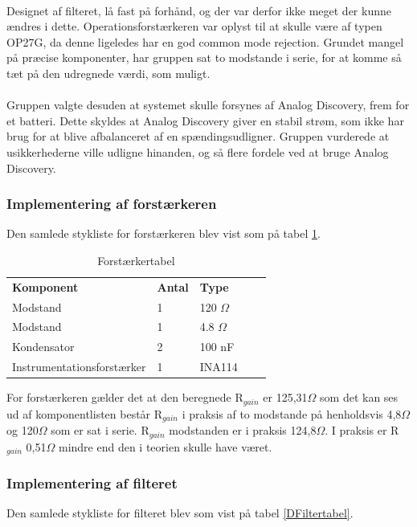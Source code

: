 \\
Designet af filteret, lå fast på forhånd, og der var derfor ikke meget der kunne ændres i dette. Operationsforstærkeren var oplyst til at skulle være af typen OP27G, da denne ligeledes har en god common mode rejection. Grundet mangel på præcise komponenter, har gruppen sat to modstande i serie, for at komme så tæt på den udregnede værdi, som muligt. \\
\\
Gruppen valgte desuden at systemet skulle forsynes af Analog Discovery, frem for et batteri. Dette skyldes at Analog Discovery giver en stabil strøm, som ikke har brug for at blive afbalanceret af en spændingsudligner. Gruppen vurderede at usikkerhederne ville udligne hinanden, og så flere fordele ved at bruge Analog Discovery.\\


\subsubsection{Implementering af forstærkeren}
Den samlede stykliste for forstærkeren blev vist som på tabel \ref{DForsttabel}.

\begin{table}[H]
\centering
\begin{tabular}{lllll}
\textbf{Komponent} & \textbf{Antal} & \textbf{Type}  &  &  \\ \cline{1-3}
Modstand           & 1              & 120 $\Omega$   &  &  \\ \cline{1-3}
Modstand           & 1              & 4.8 $\Omega$   &  &  \\ \cline{1-3}
Kondensator        & 2              & 100 nF         &  &  \\ \cline{1-3}
Instrumentationsforstærker &    1   & INA114		     &  &  \\ \cline{1-3}
\end{tabular}
\caption{Forstærkertabel}
\label{DForsttabel}
\end{table}

For forstærkeren gælder det at den beregnede R$_{gain}$ er 125,31$\Omega$ som det kan ses ud af komponentlisten består R$_{gain}$ i praksis af to modstande på henholdsvis 4,8$\Omega$ og 120$\Omega$ som er sat i serie. R$_{gain}$ modstanden er i praksis 124,8$\Omega$. I praksis er R$_{gain}$ 0,51$\Omega$ mindre end den i teorien skulle have været.

\subsubsection{Implementering af filteret}
Den samlede stykliste for filteret blev som vist på tabel \ref{DFiltertabel}.

